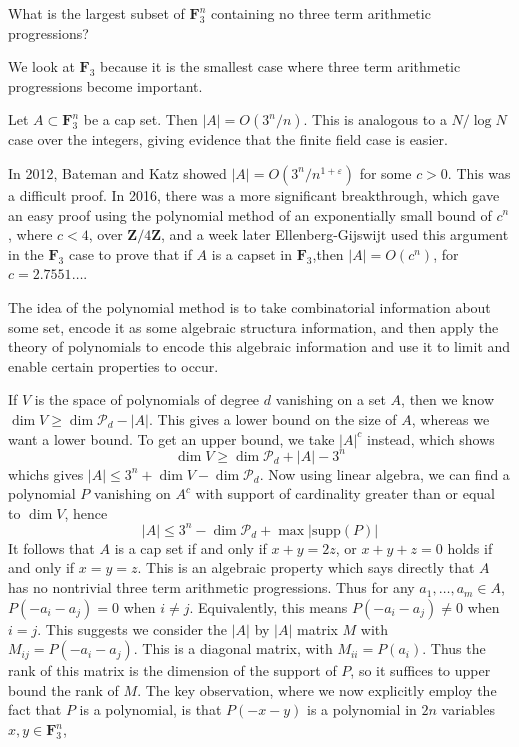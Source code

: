\begin{theorem}
	What is the largest subset of $\mathbf{F}_3^n$ containing no three term arithmetic progressions?
\end{theorem}

We look at $\mathbf{F}_3$ because it is the smallest case where three term arithmetic progressions become important.

\begin{theorem}[Meschulam - 1995]
	Let $A \subset \mathbf{F}_3^n$ be a cap set. Then $|A| = O(3^n/n)$. This is analogous to a $N/\log N$ case over the integers, giving evidence that the finite field case is easier.
\end{theorem}

In 2012, Bateman and Katz showed $|A| = O(3^n/n^{1 + \varepsilon})$ for some $c > 0$. This was a difficult proof. In 2016, there was a more significant breakthrough, which gave an easy proof using the polynomial method of an exponentially small bound of $c^n$, where $c < 4$, over $\mathbf{Z}/4\mathbf{Z}$, and a week later Ellenberg-Gijswijt used this argument in the $\mathbf{F}_3$ case to prove that if $A$ is a capset in $\mathbf{F}_3$,then $|A| = O(c^n)$, for $c = 2.7551\dots$.

The idea of the polynomial method is to take combinatorial information about some set, encode it as some algebraic structura information, and then apply the theory of polynomials to encode this algebraic information and use it to limit and enable certain properties to occur.

If $V$ is the space of polynomials of degree $d$ vanishing on a set $A$, then we know $\dim V \geq \dim \mathcal{P}_d - |A|$. This gives a lower bound on the size of $A$, whereas we want a lower bound. To get an upper bound, we take $|A|^c$ instead, which shows
%
\[ \dim V \geq \dim \mathcal{P}_d + |A| - 3^n \]
%
whichs gives $|A| \leq 3^n + \dim V - \dim \mathcal{P}_d$. Now using linear algebra, we can find a polynomial $P$ vanishing on $A^c$ with support of cardinality greater than or equal to $\dim V$, hence
%
\[ |A| \leq 3^n - \dim \mathcal{P}_d + \max |\text{supp}(P)| \]
%
It follows that $A$ is a cap set if and only if $x + y = 2z$, or $x + y + z = 0$ holds if and only if $x = y = z$. This is an algebraic property which says directly that $A$ has no nontrivial three term arithmetic progressions. Thus for any $a_1, \dots, a_m \in A$, $P(-a_i-a_j) = 0$ when $i \neq j$. Equivalently, this means $P(-a_i-a_j) \neq 0$ when $i = j$. This suggests we consider the $|A|$ by $|A|$ matrix $M$ with $M_{ij} = P(-a_i-a_j)$. This is a diagonal matrix, with $M_{ii} = P(a_i)$. Thus the rank of this matrix is the dimension of the support of $P$, so it suffices to upper bound the rank of $M$. The key observation, where we now explicitly employ the fact that $P$ is a polynomial, is that $P(-x-y)$ is a polynomial in $2n$ variables $x,y \in \mathbf{F}_3^n$,


